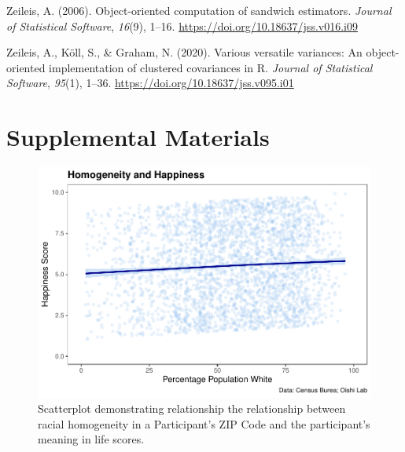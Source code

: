 \documentclass[
  man,floatsintext]{apa7}
\newlength{\cslhangindent}
\newlength{\cslentryspacingunit} %
\newenvironment{CSLReferences}[2] %
 {%
  \setlength{\parindent}{0pt}
  \ifodd #1
  \let\oldpar\par
  \def\par{\hangindent=\cslhangindent\oldpar}
  \fi
  \setlength{\parskip}{#2\cslentryspacingunit}
 }%
 {}
\begin{document}
\begin{CSLReferences}{1}{0}
\leavevmode{}%
Zeileis, A. (2006). Object-oriented computation of sandwich estimators. \emph{Journal of Statistical Software}, \emph{16}(9), 1--16. \url{https://doi.org/10.18637/jss.v016.i09}

\leavevmode{}%
Zeileis, A., Köll, S., \& Graham, N. (2020). Various versatile variances: An object-oriented implementation of clustered covariances in {R}. \emph{Journal of Statistical Software}, \emph{95}(1), 1--36. \url{https://doi.org/10.18637/jss.v095.i01}

\end{CSLReferences}

\newpage

\hypertarget{Supplemental-Materials}{%
\section{Supplemental Materials}\label{Supplemental-Materials}}

\begin{figure}[H]
\includegraphics[width=1\linewidth]{Richness-Diversity-Markdown_files/figure-latex/b-path-scatterplot-1} \caption{Scatterplot demonstrating relationship the relationship between racial homogeneity in a Participant's ZIP Code and the participant's meaning in life scores.}\label{fig:happy-appendix}
\end{figure}
\end{document}
